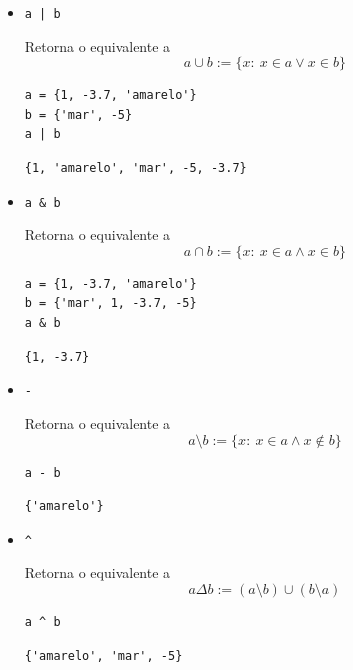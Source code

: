\begin{itemize}
\item \lstinline+a | b+ 

  Retorna o {\PYTHONset} equivalente a
  \begin{equation}
    a \cup b := \{x:~x\in a \lor x\in b\}
  \end{equation}

  
\begin{lstlisting}[xrightmargin=2.5em]
a = {1, -3.7, 'amarelo'}
b = {'mar', -5}
a | b
\end{lstlisting}

\begin{verbatim}
{1, 'amarelo', 'mar', -5, -3.7}
\end{verbatim}

\item \lstinline+a & b+ 
  
  Retorna o {\PYTHONset} equivalente a
  \begin{equation}
    a \cap b := \{x:~x\in a \land x\in b\}
  \end{equation}

\begin{lstlisting}[xrightmargin=2.5em]
a = {1, -3.7, 'amarelo'}
b = {'mar', 1, -3.7, -5}
a & b
\end{lstlisting}

\begin{verbatim}
{1, -3.7}
\end{verbatim}

\item \lstinline+-+ 

  Retorna o {\PYTHONset} equivalente a
  \begin{equation}
    a \setminus b := \{x:~x\in a \land x\not\in b\}
  \end{equation}

\begin{lstlisting}[xrightmargin=2.5em]
a - b
\end{lstlisting}

\begin{verbatim}
{'amarelo'}
\end{verbatim}

\item \lstinline+^+ 

  Retorna o {\PYTHONset} equivalente a
  \begin{equation}
    a \Delta b := (a\setminus b)\cup (b\setminus a)
  \end{equation}

\begin{lstlisting}[xrightmargin=2.5em]
a ^ b
\end{lstlisting}

\begin{verbatim}
{'amarelo', 'mar', -5}
\end{verbatim}

\end{itemize}

